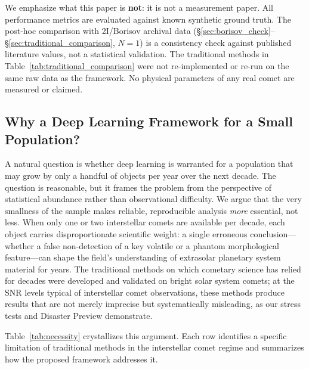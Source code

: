\documentclass[usenatbib]{mnras}
\begin{document}
We emphasize what this paper is \textbf{not}: it is not a measurement paper. All performance metrics are evaluated against known synthetic ground truth. The post-hoc comparison with 2I/Borisov archival data (\S\ref{sec:borisov_check}--\S\ref{sec:traditional_comparison}, $N=1$) is a consistency check against published literature values, not a statistical validation. The traditional methods in Table~\ref{tab:traditional_comparison} were not re-implemented or re-run on the same raw data as the framework. No physical parameters of any real comet are measured or claimed.

\subsection{Why a Deep Learning Framework for a Small Population?}

A natural question is whether deep learning is warranted for a population that may grow by only a handful of objects per year over the next decade. The question is reasonable, but it frames the problem from the perspective of statistical abundance rather than observational difficulty. We argue that the very smallness of the sample makes reliable, reproducible analysis \textit{more} essential, not less. When only one or two interstellar comets are available per decade, each object carries disproportionate scientific weight: a single erroneous conclusion---whether a false non-detection of a key volatile or a phantom morphological feature---can shape the field's understanding of extrasolar planetary system material for years. The traditional methods on which cometary science has relied for decades were developed and validated on bright solar system comets; at the SNR levels typical of interstellar comet observations, these methods produce results that are not merely imprecise but systematically misleading, as our stress tests and Disaster Preview demonstrate.

Table~\ref{tab:necessity} crystallizes this argument. Each row identifies a specific limitation of traditional methods in the interstellar comet regime and summarizes how the proposed framework addresses it.
\end{document}
